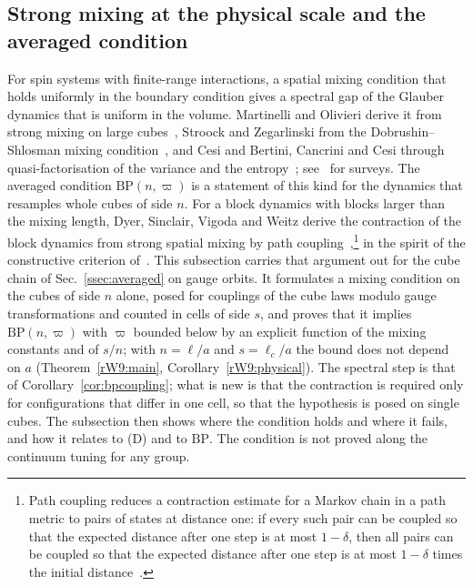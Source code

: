 \subsection{Strong mixing at the physical scale and the averaged
condition}\label{rW9:ssec}

For spin systems with finite-range interactions, a spatial mixing condition
that holds uniformly in the boundary condition gives a spectral gap of the
Glauber dynamics that is uniform in the volume. Martinelli and Olivieri
derive it from strong mixing on large cubes~\cite{MO94a,MO94b}, Stroock and
Zegarlinski from the Dobrushin--Shlosman mixing condition~\cite{SZ92a,SZ92b},
and Cesi and Bertini, Cancrini and Cesi through quasi-factorisation of the
variance and the entropy~\cite{Ces01,BCC02}; see~\cite{Mar99,GZ03} for
surveys. The averaged condition $\mathrm{BP}(n,\varpi)$ is a statement of this
kind for the dynamics that resamples whole cubes of side $n$. For a block
dynamics with blocks larger than the mixing length, Dyer, Sinclair, Vigoda
and Weitz derive the contraction of the block dynamics from strong spatial
mixing by path coupling~\cite{DSVW04,BD97},\footnote{Path coupling reduces a contraction estimate for a Markov chain in a path metric to pairs of states at distance one: if every such pair can be coupled so that the expected distance after one step is at most $1-\delta$, then all pairs can be coupled so that the expected distance after one step is at most $1-\delta$ times the initial distance~\cite{BD97}.} in the spirit of the
constructive criterion of~\cite{DS85}. This subsection carries that
argument out for the cube chain of Sec.~\ref{ssec:averaged} on gauge orbits.
It formulates a mixing condition on the cubes of side $n$ alone, posed for
couplings of the cube laws modulo gauge transformations and counted in cells
of side $s$, and proves that it implies $\mathrm{BP}(n,\varpi)$ with $\varpi$
bounded below by an explicit function of the mixing constants and of $s/n$;
with $n=\ell/a$ and $s=\ell_c/a$ the bound does not depend on $a$
(Theorem~\ref{rW9:main}, Corollary~\ref{rW9:physical}). The spectral step is
that of Corollary~\ref{cor:bpcoupling}; what is new is that the contraction
is required only for configurations that differ in one cell, so that the
hypothesis is posed on single cubes. The subsection then shows where the
condition holds and where it fails, and how it relates to (D) and to
$\mathrm{BP}$. The condition is not proved along the continuum tuning for any
group.

